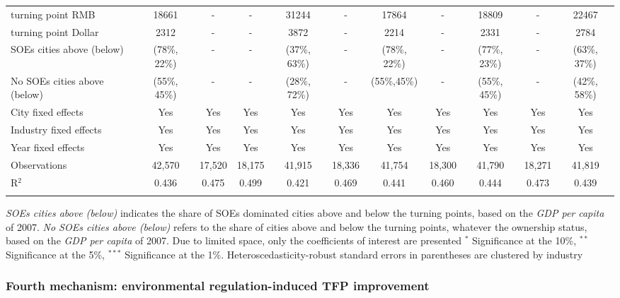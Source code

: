 \documentclass[12pt]{article}
\begin{document}
\begin{sidewaystable}
\begin{adjustbox}{width=\textwidth, totalheight=\baselineskip,keepaspectratio}
\begin{tabular}{@{\extracolsep{5pt}}lcccccccccc}
turning point RMB & 18661 & - & - & 31244 & - & 17864 & - & 18809 & - & 22467 \\ 
turning point Dollar & 2312 & - & - & 3872 & - & 2214 & - & 2331 & - & 2784 \\ 
SOEs cities above (below) & 
(78\%, 22\%)& - & - & 
(37\%, 63\%)& - & 
(78\%, 22\%)  & - & 
(77\%, 23\%)& - & 
(63\%, 37\%) \\
No SOEs cities above (below) & 
(55\%, 45\%) & - & - & 
(28\%, 72\%) & - & 
(55\%,45\%) & - &  
(55\%, 45\%) & - & 
(42\%, 58\%) \\
City fixed effects & Yes & Yes & Yes & Yes & Yes & Yes & Yes & Yes & Yes & Yes \\ 
Industry fixed effects & Yes & Yes & Yes & Yes & Yes & Yes & Yes & Yes & Yes & Yes \\ 
Year fixed effects & Yes & Yes & Yes & Yes & Yes & Yes & Yes & Yes & Yes & Yes \\ 
Observations & 42,570 & 17,520 & 18,175 & 41,915 & 18,336 & 41,754 & 18,300 & 41,790 & 18,271 & 41,819 \\ 
R$^{2}$ & 0.436 & 0.475 & 0.499 & 0.421 & 0.469 & 0.441 & 0.460 & 0.444 & 0.473 & 0.439 \\ 
\hline 
\hline \\[-1.8ex] 
\end{tabular}
\end{adjustbox}
\begin{tablenotes} 
 \small 
 \item
\footnotesize{
\textit{SOEs cities above (below)} indicates the share of SOEs dominated cities above and below the turning points, based on the \textit{GDP per capita} of 2007. 
\textit{No SOEs cities above (below)} refers to the share of cities above and below the turning points, whatever the ownership status, based on the \textit{GDP per capita} of 2007.%
Due to limited space, only the coefficients of interest are presented $^{*}$ Significance at the 10\%, $^{**}$ Significance at the 5\%, $^{***}$ Significance at the 1\%. Heteroscedasticity-robust standard errors in parentheses are clustered by industry 
}
 
\end{tablenotes}
\end{sidewaystable}

\subsubsection{Fourth mechanism: environmental regulation-induced TFP improvement}
\end{document}
